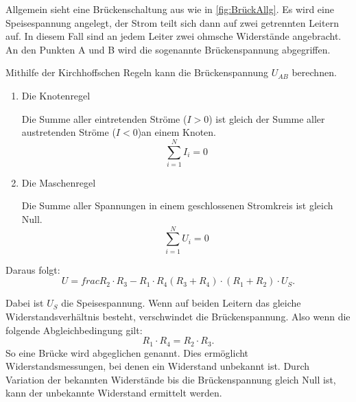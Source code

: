 Allgemein sieht eine Brückenschaltung aus wie in \ref{fig:BrückAllg}.
Es wird eine Speisespannung angelegt, der Strom teilt sich dann auf zwei getrennten Leitern auf.
In diesem Fall sind an jedem Leiter zwei ohmsche Widerstände angebracht.
An den Punkten A und B wird die sogenannte Brückenspannung abgegriffen.

Mithilfe der Kirchhoffschen Regeln kann die Brückenspannung $U_{AB}$ berechnen.
\begin{enumerate}
    \item {Die Knotenregel
    
    Die Summe aller eintretenden Ströme ($I>0$) ist gleich der Summe aller austretenden Ströme ($I<0$)an einem Knoten.
    \begin{equation}
        {\sum_{i=1}^N I_i} = 0
    \end{equation}
    }

    \item{Die Maschenregel
    
    Die Summe aller Spannungen in einem geschlossenen Stromkreis ist gleich Null.
    \begin{equation}
        {\sum_{i=1}^N U_i} = 0
    \end{equation}}
\end{enumerate}

Daraus folgt:
\begin{equation}
    U = frac{R_2 \cdot R_3 - R_1 \cdot R_4}{(R_3 + R_4) \cdot (R_1 + R_2)} \cdot U_S .
\end{equation}

Dabei ist $U_S$ die Speisespannung.
Wenn auf beiden Leitern das gleiche Widerstandsverhältnis besteht, verschwindet die Brückenspannung.
Also wenn die folgende Abgleichbedingung gilt:
\begin{equation}
\label{eqn:Abgleichbedingung}
    R_1 \cdot R_4 = R_2 \cdot R_3 .
\end{equation}
So eine Brücke wird abgeglichen genannt.
Dies ermöglicht Widerstandsmessungen, bei denen ein Widerstand unbekannt ist.
Durch Variation der bekannten Widerstände bis die Brückenspannung gleich Null ist, kann der unbekannte Widerstand ermittelt werden.

